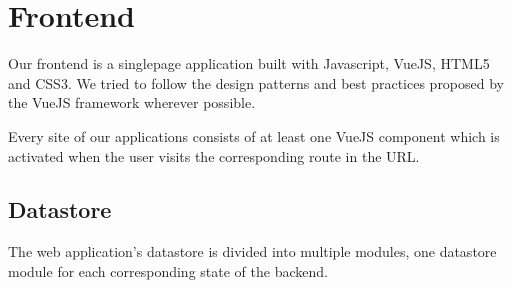 \section{Frontend}
Our frontend is a singlepage application built with Javascript, VueJS, HTML5 and CSS3. We tried to follow the design patterns and best practices proposed by the VueJS framework wherever possible.

Every site of our applications consists of at least one VueJS component which is activated when the user visits the corresponding route in the URL.
\subsection{Datastore}
The web application's datastore is divided into multiple modules, one datastore module for each corresponding state of the backend.
 
